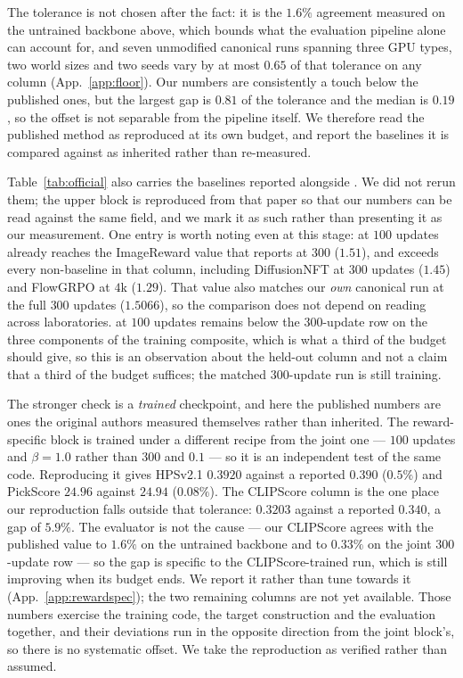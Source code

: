 The tolerance is not chosen after the fact: it is the $1.6\%$ agreement measured on the
untrained backbone above, which bounds what the evaluation pipeline alone can account for,
and seven unmodified canonical runs spanning three GPU types, two world sizes and two seeds
vary by at most $0.65$ of that tolerance on any column (App.~\ref{app:floor}). Our numbers
are consistently a touch below the published ones, but the largest gap is $0.81$ of the
tolerance and the median is $0.19$, so the offset is not separable from the pipeline itself.
We therefore read the published method as reproduced at its own budget, and report the
baselines it is compared against as inherited rather than re-measured.

Table~\ref{tab:official} also carries the baselines reported alongside \opsd. We did not
rerun them; the upper block is reproduced from that paper so that our numbers can be read
against the same field, and we mark it as such rather than presenting it as our
measurement. One entry is worth noting even at this stage: at $100$ updates \MSP already
reaches the ImageReward value that \opsd reports at $300$ ($1.51$), and exceeds every
non-\opsd baseline in that column, including DiffusionNFT at $300$ updates ($1.45$) and
FlowGRPO at $4$k ($1.29$). That value also matches our \emph{own} canonical run at the
full $300$ updates ($1.5066$), so the comparison does not depend on reading across
laboratories. \MSP at $100$ updates remains below the $300$-update row on the three
components of the training composite, which is what a third of the budget should give, so
this is an observation about the held-out column and not a claim that a third of the budget
suffices; the matched $300$-update \MSP run is still training.

The stronger check is a \emph{trained} checkpoint, and here the published numbers are ones
the original authors measured themselves rather than inherited. The reward-specific block is
trained under a different recipe from the joint one --- $100$ updates and $\beta=1.0$ rather
than $300$ and $0.1$ --- so it is an independent test of the same code. Reproducing it gives
HPSv2.1 $0.3920$ against a reported $0.390$ ($0.5\%$) and PickScore $24.96$ against $24.94$
($0.08\%$). The CLIPScore column is the one place our reproduction falls outside that
tolerance: $0.3203$ against a reported $0.340$, a gap of $5.9\%$. The evaluator is not the
cause --- our CLIPScore agrees with the published value to $1.6\%$ on the untrained backbone
and to $0.33\%$ on the joint $300$-update row --- so the gap is specific to the
CLIPScore-trained run, which is still improving when its budget ends. We report it rather
than tune towards it (App.~\ref{app:rewardspec}); the two remaining columns are not yet
available.
Those numbers exercise the training code, the target construction and the evaluation
together, and their deviations run in the opposite direction from the joint block's, so
there is no systematic offset. We take the reproduction as verified rather than assumed.

